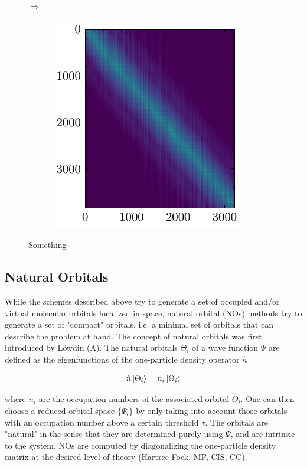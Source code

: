 \begin{figure}[h]
\begin{subfigure}{0.5\linewidth}
\end{subfigure}
$\Longrightarrow$
\begin{subfigure}{0.4\linewidth}
\centering
\includegraphics[scale=1.0]{choleskyV}
\end{subfigure}%
\caption{Something}
\end{figure} 

\subsection{Natural Orbitals}

While the schemes described above try to generate a set of occupied and/or virtual molecular orbitals localized in space, natural orbital (NOs) methods try to generate a set of "compact" orbitals, i.e. a minimal set of orbitals that can describe the problem at hand. The concept of natural orbitals was first introduced by Löwdin (A). The natural orbitals $\Theta_i$ of a wave function $\Psi$ are defined as the eigenfunctions of the one-particle density operator $\hat{n}$

\begin{equation}
\hat{n}\ket{\Theta_i} = n_i \ket{\Theta_i} 
\end{equation}

\noindent where $n_i$ are the occupation numbers of the associated orbital $\Theta_i$. One can then choose a reduced orbital space $\{\tilde{\Psi}_i\}$ by only taking into account those orbitals with an occupation number above a certain threshold $\tau$. The orbitals are "natural" in the sense that they are determined purely using $\Psi$, and are intrinsic to the system. NOs are computed by diagonalizing the one-particle density matrix at the desired level of theory (Hartree-Fock, MP, CIS, CC). 

